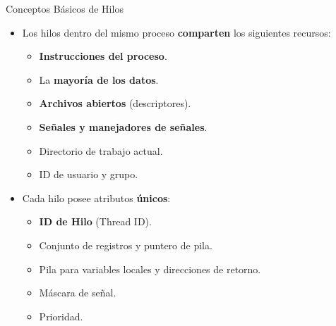 \documentclass{beamer}
\begin{document}
\begin{frame}{Conceptos Básicos de Hilos}
    \begin{itemize}
        \item Los hilos dentro del mismo proceso \textbf{comparten} los siguientes recursos:
        \begin{itemize}
            \item \textbf{Instrucciones del proceso}.
            \item La \textbf{mayoría de los datos}.
            \item \textbf{Archivos abiertos} (descriptores).
            \item \textbf{Señales y manejadores de señales}.
            \item Directorio de trabajo actual.
            \item ID de usuario y grupo.
        \end{itemize}
        \item Cada hilo posee atributos \textbf{únicos}:
        \begin{itemize}
            \item \textbf{ID de Hilo} (Thread ID).
            \item Conjunto de registros y puntero de pila.
            \item Pila para variables locales y direcciones de retorno.
            \item Máscara de señal.
            \item Prioridad.
        \end{itemize}
    \end{itemize}
\end{frame}
\end{document}
